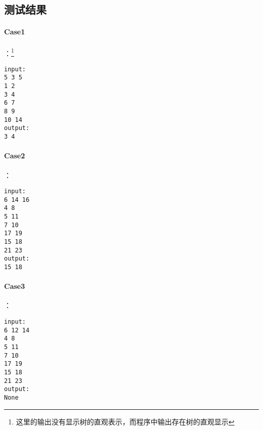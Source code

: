 \documentclass{article}
\begin{document}
\subsection{测试结果}
\paragraph{Case1}：\footnote{这里的输出没有显示树的直观表示，而程序中输出存在树的直观显示}
\begin{lstlisting}
input:
5 3 5
1 2
3 4
6 7
8 9
10 14
output:
3 4
\end{lstlisting}

\paragraph{Case2}：
\begin{lstlisting}
input:
6 14 16
4 8
5 11
7 10
17 19
15 18
21 23
output:
15 18
\end{lstlisting}

\paragraph{Case3}：
\begin{lstlisting}
input:
6 12 14
4 8
5 11
7 10
17 19
15 18
21 23
output:
None
\end{lstlisting}
\end{document}
